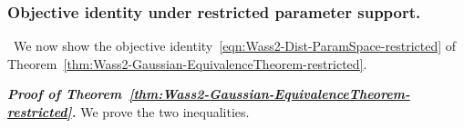 \documentclass[opre,sglanonrev]{informs4}
\newtheorem{corollary}{Corollary}
\newcommand{\mN}{\mathcal{N}}
\newcommand{\mbR}{\mathbb R}
\newcommand{\mbGM}{\mathbb{GM}}
\newcommand{\bs}{\bm{s}}
\newcommand{\bz}{\bm{z}}
\begin{document}
{\begin{APPENDICES}


\subsubsection{Objective identity under restricted parameter support. } \,
We now show the objective identity~\eqref{eqn:Wass2-Dist-ParamSpace-restricted} of Theorem~\ref{thm:Wass2-Gaussian-EquivalenceTheorem-restricted}.


\noindent\textit{\textbf{Proof of Theorem~\ref{thm:Wass2-Gaussian-EquivalenceTheorem-restricted}.}}
We prove the two inequalities.


\end{APPENDICES}}
\end{document}
